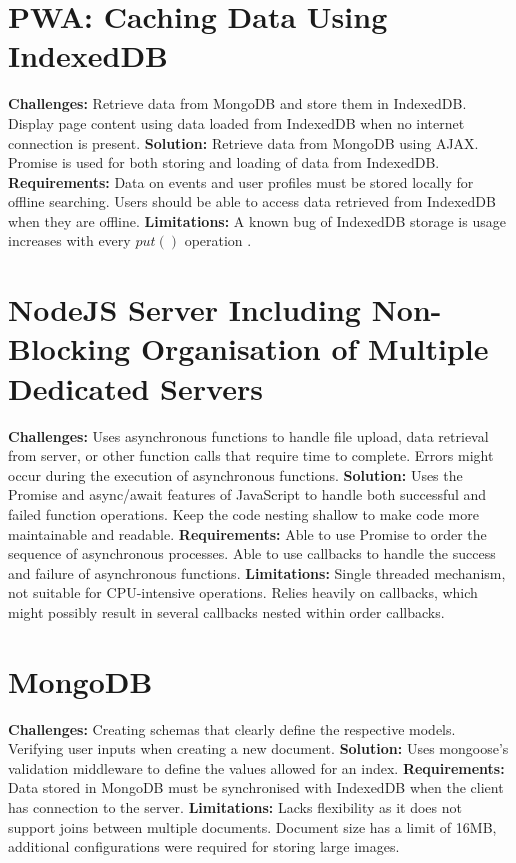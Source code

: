 \documentclass[11pt, a4paper]{article}
\begin{document}
\section{PWA: Caching Data Using IndexedDB}
\textbf{Challenges:} Retrieve data from MongoDB and store them in IndexedDB. Display page content
using data loaded from IndexedDB when no internet connection is present. \textbf{Solution:} Retrieve
data from MongoDB using AJAX. Promise is used for both storing and loading of data from IndexedDB.
\textbf{Requirements:} Data on events and user profiles must be stored locally for offline searching.
Users should be able to access data retrieved from IndexedDB when they are offline.
\textbf{Limitations:} A known bug of IndexedDB storage is usage increases with every $put()$
operation \cite{leveldb_593, leveldb_603}.

\section{NodeJS Server Including Non-Blocking Organisation of Multiple Dedicated Servers}
\textbf{Challenges:} Uses asynchronous functions to handle file upload, data retrieval from server,
or other function calls that require time to complete. Errors might occur during the execution
of asynchronous functions. \textbf{Solution:} Uses the Promise and async/await features of
JavaScript to handle both successful and failed function operations. Keep the code nesting shallow
to make code more maintainable and readable. \textbf{Requirements:} Able to use Promise to order the
sequence of asynchronous processes. Able to use callbacks to handle the success and failure of
asynchronous functions. \textbf{Limitations:} Single threaded mechanism, not suitable for
CPU-intensive operations. Relies heavily on callbacks, which might possibly result in several
callbacks nested within order callbacks.

\section{MongoDB}
\textbf{Challenges:} Creating schemas that clearly define the respective models. Verifying user
inputs when creating a new document. \textbf{Solution:} Uses mongoose's validation middleware
\cite{validation} to define the values allowed for an index. \textbf{Requirements:} Data stored in
MongoDB must be synchronised with IndexedDB when the client has connection to the server.
\textbf{Limitations:} Lacks flexibility as it does not support joins between multiple documents.
Document size has a limit of 16MB, additional configurations were required for storing large images.
\end{document}
